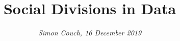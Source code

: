 \documentclass[12pt]{article}
\begin{document}
\makeatletter
\renewcommand\section{\@startsection {section}{1}{\z@}%
                                   {-1.5ex\@plus -1ex \@minus -.2ex}%
                                   {.75ex \@plus .2ex}%
                                   {\normalfont\normalsize\bfseries}}%
\renewcommand\subsection{\@startsection{subsection}{2}{\z@}%
                                   {-1.0ex\@plus -1ex \@minus -.2ex}%
                                   {.5ex \@plus .2ex}%
                                   {\normalfont\normalsize\itshape}}%
\makeatother


\title{\vspace{-10pt} Social Divisions in Data}
       
\author{\textit{Simon Couch, 16 December 2019}}

\date{}

\maketitle

\doublespace






\clearpage




\clearpage

\appendix

\end{document}
